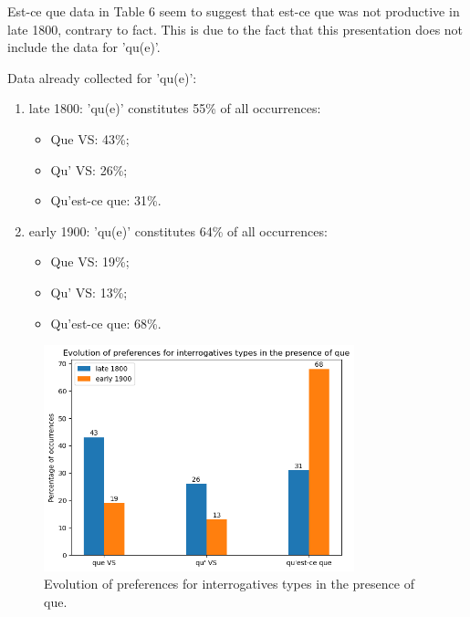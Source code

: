 \documentclass[fleqn,10pt]{wlscirep}
\begin{document}
  \noindent Est-ce que data in Table 6 seem to suggest that est-ce que was not productive in late 1800, contrary to fact.
  \noindent This is due to the fact that this presentation does not include the data for 'qu(e)'.

  Data already collected for 'qu(e)':
  \begin{enumerate}
    \item late 1800: 'qu(e)' constitutes 55\% of all occurrences:
        \begin{itemize}
            \item[\ding{227}] \vspace*{-2mm} Que VS: 43\%;
            \item[\ding{227}] \vspace*{-2mm} Qu' VS: 26\%;
            \item[\ding{227}] \vspace*{-2mm} Qu'est-ce que: 31\%.
        \end{itemize}
    \item early 1900: 'qu(e)' constitutes 64\% of all occurrences:
        \begin{itemize}
            \item[\ding{227}] \vspace*{-2mm} Que VS: 19\%;
            \item[\ding{227}] \vspace*{-2mm} Qu' VS: 13\%;
            \item[\ding{227}] \vspace*{-2mm} Qu'est-ce que: 68\%.
        \end{itemize}
\end{enumerate}

  \begin{figure}[H]
    \centering
    \includegraphics[width=90mm]{images/que.png} %
    \caption{Evolution of preferences for interrogatives types in the presence of que.}
    \label{fig:boat5}
  \end{figure}
\end{document}
